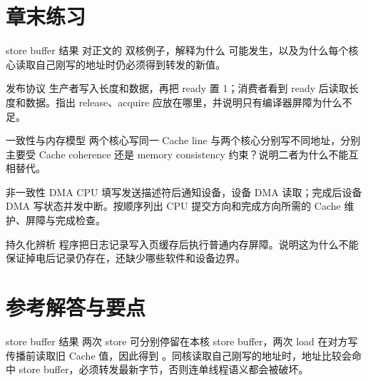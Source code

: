\section*{章末练习}

\begin{chapterexercise}{store buffer 结果}
对正文的  双核例子，解释为什么  可能发生，以及为什么每个核心读取自己刚写的地址时仍必须得到转发的新值。
\end{chapterexercise}

\begin{chapterexercise}{发布协议}
生产者写入长度和数据，再把 ready 置 1；消费者看到 ready 后读取长度和数据。指出 release、acquire 应放在哪里，并说明只有编译器屏障为什么不足。
\end{chapterexercise}

\begin{chapterexercise}{一致性与内存模型}
两个核心写同一 Cache line 与两个核心分别写不同地址，分别主要受 Cache coherence 还是 memory consistency 约束？说明二者为什么不能互相替代。
\end{chapterexercise}

\begin{chapterexercise}{非一致性 DMA}
CPU 填写发送描述符后通知设备，设备 DMA 读取；完成后设备 DMA 写状态并发中断。按顺序列出 CPU 提交方向和完成方向所需的 Cache 维护、屏障与完成检查。
\end{chapterexercise}

\begin{chapterexercise}{持久化辨析}
程序把日志记录写入页缓存后执行普通内存屏障。说明这为什么不能保证掉电后记录仍存在，还缺少哪些软件和设备边界。
\end{chapterexercise}

\section*{参考解答与要点}

\begin{chapteranswer}{store buffer 结果}
两次 store 可分别停留在本核 store buffer，两次 load 在对方写传播前读取旧 Cache 值，因此得到 。同核读取自己刚写的地址时，地址比较会命中 store buffer，必须转发最新字节，否则连单线程语义都会被破坏。
\end{chapteranswer}

